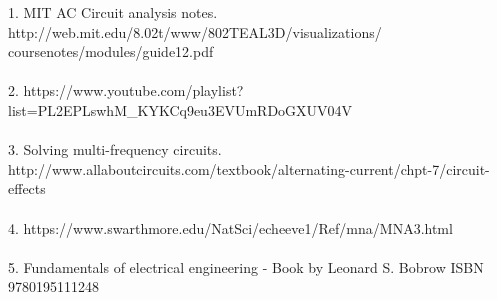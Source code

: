 \documentclass{scrreprt}
\begin{document}
$ $1. MIT AC Circuit analysis notes. http://web.mit.edu/8.02t/www/802TEAL3D/visualizations/
coursenotes/modules/guide12.pdf \\
\\
2. https://www.youtube.com/playlist?list=PL2EPLswhM_KYKCq9eu3EVUmRDoGXUV04V \\
\\
3. Solving multi-frequency circuits. http://www.allaboutcircuits.com/textbook/alternating-current/chpt-7/circuit-effects \\
\\
4. https://www.swarthmore.edu/NatSci/echeeve1/Ref/mna/MNA3.html \\
\\
5. Fundamentals of electrical engineering - Book by Leonard S. Bobrow ISBN 9780195111248 $ $
\\
\\
\end{document}
